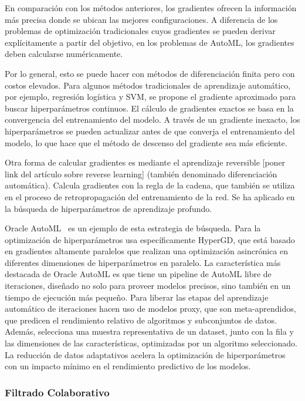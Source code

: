 En comparación con los métodos anteriores, los gradientes ofrecen la información más precisa donde se ubican las mejores configuraciones. A diferencia de los problemas de optimización tradicionales cuyos gradientes se pueden derivar explícitamente a partir del objetivo, en los problemas de AutoML, los gradientes deben calcularse numéricamente.

Por lo general, esto se puede hacer con métodos de diferenciación finita pero con costos elevados. Para algunos métodos tradicionales de aprendizaje automático, por ejemplo, regresión logística y SVM, se propone el gradiente aproximado para buscar hiperparámetros continuos. El cálculo de gradientes exactos se basa en la convergencia del entrenamiento del modelo. A través de un gradiente inexacto, los hiperparámetros se pueden actualizar antes de que converja el entrenamiento del modelo, lo que hace que el método de descenso del gradiente sea más eficiente.

Otra forma de calcular gradientes es mediante el aprendizaje reversible [poner link del artículo sobre reverse learning] (también denominado diferenciación automática). Calcula gradientes con la regla de la cadena, que también se utiliza en el proceso de retropropagación del entrenamiento de la red. Se ha aplicado en la búsqueda de hiperparámetros de aprendizaje profundo. 

Oracle AutoML~\cite{OracleAutoML} es un ejemplo de esta estrategia de búsqueda. Para la optimización de hiperparámetros usa específicamente HyperGD, que está basado en gradientes altamente paralelos que realizan una optimización asincrónica en diferentes dimensiones de hiperparámetros en paralelo. La característica más destacada de Oracle AutoML es que tiene un pipeline de AutoML libre de iteraciones, diseñado no solo para proveer modelos precisos, sino también en un tiempo de ejecución más pequeño. Para liberar las etapas del aprendizaje automático de iteraciones hacen uso de modelos proxy, que son meta-aprendidos, que predicen el rendimiento relativo de algoritmos y subconjuntos de datos. Además, selecciona una muestra representativa de un dataset, junto con la fila y las dimensiones de las características, optimizadas por un algoritmo seleccionado. La reducción de datos adaptativos acelera la optimización de hiperparámetros con un impacto mínimo en el rendimiento predictivo de los modelos.

\subsubsection{Filtrado Colaborativo}

